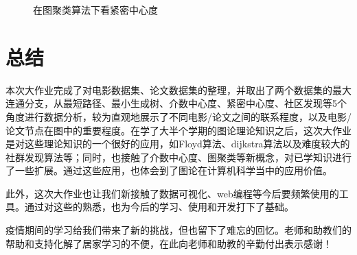 \documentclass[UTF8, onecolumn, a4paper]{article}
\begin{document}
\begin{center}
\begin{figure}[ht]
\begin{minipage}[b]{0.95\linewidth}
\begin{minipage}[b]{0.46\linewidth}
				\caption{在图聚类算法下看紧密中心度}
			\end{minipage}
		\end{minipage}
	\end{figure}
\end{center}
\section{总结}
    本次大作业完成了对电影数据集、论文数据集的整理，并取出了两个数据集的最大连通分支，从最短路径、最小生成树、介数中心度、紧密中心度、社区发现等5个角度进行数据分析，较为直观地展示了不同电影/论文之间的联系程度，以及电影/论文节点在图中的重要程度。在学了大半个学期的图论理论知识之后，这次大作业是对这些理论知识的一个很好的应用，如Floyd算法、dijkstra算法以及难度较大的社群发现算法等；同时，也接触了介数中心度、图聚类等新概念，对已学知识进行了一些扩展。通过这些应用，也体会到了图论在计算机科学当中的应用价值。
    
    此外，这次大作业也让我们新接触了数据可视化、web编程等今后要频繁使用的工具。通过对这些的熟悉，也为今后的学习、使用和开发打下了基础。
    
    疫情期间的学习给我们带来了新的挑战，但也留下了难忘的回忆。老师和助教们的帮助和支持化解了居家学习的不便，在此向老师和助教的辛勤付出表示感谢！




\appendix
\end{document}
